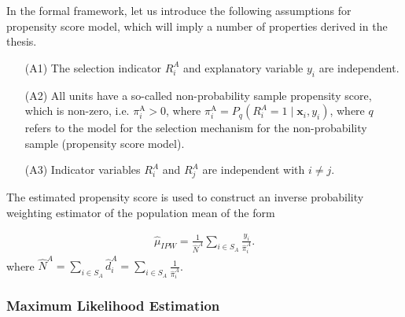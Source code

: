 \documentclass[
]{jss}
\begin{document}
In the formal framework, let us introduce the following assumptions for
propensity score model, which will imply a number of properties derived
in the thesis.

\begin{itemize}
    \item[(A1)] The selection indicator $R_i^A$ and explanatory variable $y_i$ are independent.
    \item[(A2)]All units have a so-called non-probability sample propensity score, which is non-zero, i.e. $\pi_i^{\mathrm{A}} > 0$, where $\pi_i^{\mathrm{A}} = P_q\left(R_i^A=1 \mid \boldsymbol{x}_i, y_i\right)$, where $q$ refers to the model for the selection mechanism for the non-probability sample (propensity score model).
    \item[(A3)] Indicator variables $R_i^A$ and $R_j^A$ are independent with $i \neq j$. 
\end{itemize}

The estimated propensity score is used to construct an inverse
probability weighting estimator of the population mean of the form

\begin{equation}
\begin{gathered}
\hat{\mu}_{I P W}=\frac{1}{\hat{N}^A} \sum_{i \in S_A} \frac{y_i}{\hat{\pi}_i^A}.
\end{gathered}
\end{equation} where
\(\hat{N}^A = \sum_{i \in S_A} \hat{d}_i^A = \sum_{i \in S_A} \frac{1}{\hat{\pi}_i^A}\).

\subsubsection{Maximum Likelihood
Estimation}\label{maximum-likelihood-estimation}
\end{document}
